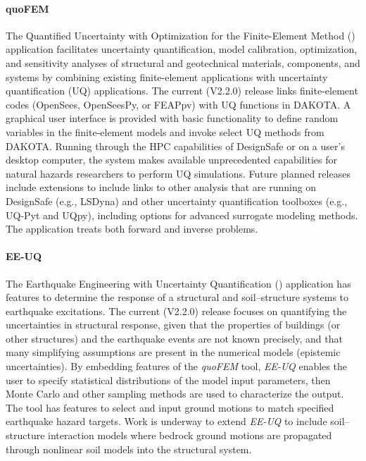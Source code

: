 \paragraph{quoFEM}  The Quantified Uncertainty with Optimization for the Finite-Element Method () application facilitates uncertainty quantification, model calibration, optimization, and sensitivity analyses of structural and geotechnical materials, components, and systems by combining existing finite-element applications with uncertainty quantification (UQ) applications. The current (V2.2.0) release links finite-element codes (OpenSees, OpenSeesPy, or FEAPpv) with UQ functions in DAKOTA. A graphical user interface is provided with basic functionality to define random variables in the finite-element models and invoke select UQ methods from DAKOTA. Running through the HPC capabilities of DesignSafe or on a user’s desktop computer, the system makes available unprecedented capabilities for natural hazards researchers to perform UQ simulations. Future planned releases include extensions to include links to other analysis that are running on DesignSafe (e.g., LSDyna) and other uncertainty quantification toolboxes (e.g., UQ-Pyt and UQpy), including options for advanced surrogate modeling methods. The application treats both forward and inverse problems.

\paragraph{EE-UQ} The Earthquake Engineering with Uncertainty Quantification () application has features to determine the response of a structural and soil--structure systems to earthquake excitations. The current (V2.2.0) release focuses on quantifying the uncertainties in structural response, given that the properties of buildings (or other structures) and the earthquake events are not known precisely, and that many simplifying assumptions are present in the numerical models (epistemic uncertainties).  By embedding features of the \emph{quoFEM} tool, \emph{EE-UQ} enables the user to specify statistical distributions of the model input parameters, then Monte Carlo and other sampling methods are used to characterize the output. The tool has features to select and input ground motions to match specified earthquake hazard targets. Work is underway to extend \emph{EE-UQ} to include soil--structure interaction models where bedrock ground motions are propagated through nonlinear soil models into the structural system.

